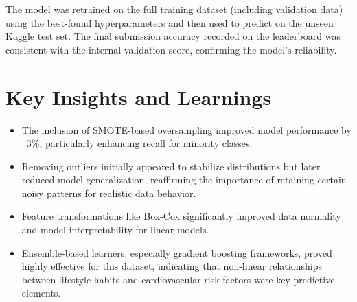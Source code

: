 The model was retrained on the full training dataset (including validation data) using the best-found hyperparameters and then used to predict on the unseen Kaggle test set.
The final submission accuracy recorded on the leaderboard was consistent with the internal validation score, confirming the model’s reliability.


\section{Key Insights and Learnings}\label{sec:key-insights-and-learnings}

\begin{itemize}
    \item The inclusion of SMOTE-based oversampling improved model performance by ~3\%, particularly enhancing recall for minority classes.
    \item Removing outliers initially appeared to stabilize distributions but later reduced model generalization, reaffirming the importance of retaining certain noisy patterns for realistic data behavior.
    \item Feature transformations like Box-Cox significantly improved data normality and model interpretability for linear models.
    \item Ensemble-based learners, especially gradient boosting frameworks, proved highly effective for this dataset, indicating that non-linear relationships between lifestyle habits and cardiovascular risk factors were key predictive elements.
\end{itemize}

